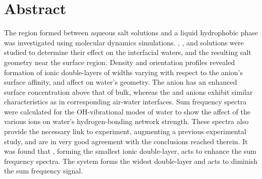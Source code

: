 \section{Abstract}


The region formed between aqueous salt solutions and a liquid hydrophobic phase was investigated using molecular dynamics simulations. \nacl, \sodnit, and \sodsul solutions were studied to determine their effect on the interfacial waters, and the resulting salt geometry near the surface region. Density and orientation profiles revealed formation of ionic double-layers of widths varying with respect to the anion's surface affinity, and affect on water's geometry. The \nit anion has an enhanced surface concentration above that of bulk, whereas the \cl and \sul anions exhibit similar characteristics as in corresponding air-water interfaces. Sum frequency spectra were calculated for the OH-vibrational modes of water to show the affect of the various ions on water's hydrogen-bonding network strength. These spectra also provide the necessary link to experiment, augmenting a previous experimental study, and are in very good agreement with the conclusions reached therein. It was found that \sodsul, forming the smallest ionic double-layer, acts to enhance the sum frequency spectra. The \sodnit system forms the widest double-layer and acts to diminish the sum frequency signal.
